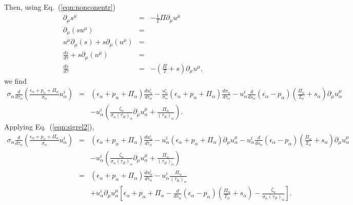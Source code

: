 \documentclass[aps,article]{revtex4}
\begin{document}
Then, using Eq.\ (\ref{eqn:nonconentr})
\begin{eqnarray}\label{eqn:nonconentr}
\partial_{\mu}s^{\mu}&=&-\frac{1}{T}\Pi\partial_{\mu}u^{\mu}\nonumber\\
\partial_{\mu}\left(s u^{\mu}\right)&=&\nonumber\\
u^{\mu}\partial_{\mu}\left(s \right)+s\partial_{\mu}\left( u^{\mu}\right)&=&\nonumber\\
\frac{ds}{d\tau}+s\partial_{\mu}\left( u^{\mu}\right)&=&\nonumber\\
\frac{ds}{d\tau}&=&-\left(\frac{\Pi}{T}+s\right)\partial_{\mu}u^{\mu},
\end{eqnarray}
we find
\begin{eqnarray}
\sigma_{\alpha}\frac{d}{d\tau_{\alpha}}\left(\frac{\epsilon_{\alpha} +p_{\alpha}+\Pi_{\alpha}}{\sigma_{\alpha}}u^{i}_{\alpha}\right)
&=&\left(\epsilon_{\alpha} +p_{\alpha}+\Pi_{\alpha}\right)\frac{du^{i}_{\alpha}}{d\tau_{\alpha}}- \frac{u^i_{\alpha}}{\sigma_{\alpha}} \left(\epsilon_{\alpha} +p_{\alpha}+\Pi_{\alpha}\right) \frac{d\sigma_{\alpha}}{d\tau_{\alpha}} -u^i_{\alpha}     \frac{d}{ds_{\alpha}}\left(\epsilon_{\alpha} -p_{\alpha}\right)\left(\frac{\Pi_{\alpha}}{T_{\alpha}}+s_{\alpha}\right)\partial_{\mu}u^{\mu}_{\alpha} \nonumber\\
&& - u^i_{\alpha}     \left(\frac{\zeta_{\alpha}}{\sigma_{\alpha}(\tau_R)_{\alpha}}\partial_{\mu}u^{\mu}_{\alpha}+\frac{\Pi_{\alpha}}{(\tau_R)_{\alpha}}\right).
\end{eqnarray}
Applying Eq.\ (\ref{eqn:sigrel2}),
\begin{eqnarray}
\sigma_{\alpha}\frac{d}{d\tau_{\alpha}}\left(\frac{\epsilon_{\alpha} +p_{\alpha}+\Pi_{\alpha}}{\sigma_{\alpha}}u^{i}_{\alpha}\right)
&=&\left(\epsilon_{\alpha} +p_{\alpha}+\Pi_{\alpha}\right)\frac{du^{i}_{\alpha}}{d\tau_{\alpha}}- u^i_{\alpha} \left(\epsilon_{\alpha} +p_{\alpha}+\Pi_{\alpha}\right) \partial_{\mu}u^{\mu}_{\alpha} -u^i_{\alpha}     \frac{d}{ds_{\alpha}}\left(\epsilon_{\alpha} -p_{\alpha}\right)\left(\frac{\Pi_{\alpha}}{T_{\alpha}}+s_{\alpha}\right)\partial_{\mu}u^{\mu}_{\alpha} \nonumber\\
&& - u^i_{\alpha}    \left(\frac{\zeta_{\alpha}}{\sigma_{\alpha}(\tau_R)_{\alpha}}\partial_{\mu}u^{\mu}_{\alpha}+\frac{\Pi_{\alpha}}{(\tau_R)_{\alpha}}\right)\nonumber\\
&=&\left(\epsilon_{\alpha} +p_{\alpha}+\Pi_{\alpha}\right)\frac{du^{i}_{\alpha}}{d\tau_{\alpha}}- u^i_{\alpha}    \frac{\Pi_{\alpha}}{(\tau_R)_{\alpha}}\nonumber\\
& &+ u^i_{\alpha}\partial_{\mu}u^{\mu}_{\alpha}  \left[\epsilon_{\alpha} +p_{\alpha}+\Pi_{\alpha} -\frac{d}{ds_{\alpha}}\left(\epsilon_{\alpha} -p_{\alpha}\right)\left(\frac{\Pi_{\alpha}}{T_{\alpha}}+s_{\alpha}\right) -\frac{\zeta_{\alpha}}{\sigma_{\alpha}(\tau_R)_{\alpha}}\right].
\end{eqnarray}
\end{document}

